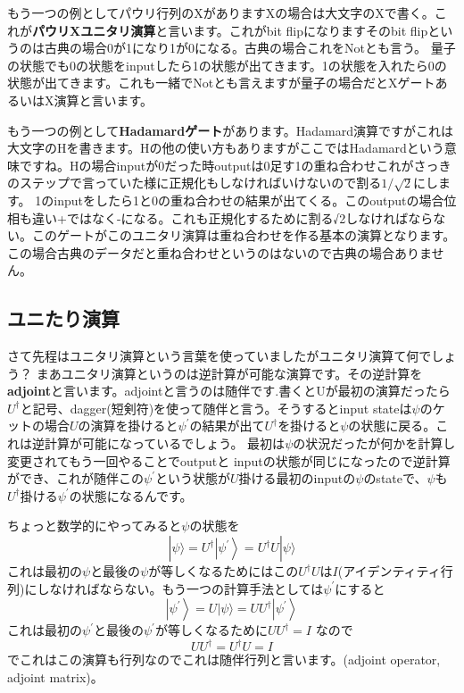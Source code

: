 もう一つの例としてパウリ行列のXがありますXの場合は大文字のXで書く。これが\textbf{パウリXユニタリ演算}と言います。これがbit flipになりますそのbit flipというのは古典の場合0が1になり1が0になる。古典の場合これをNotとも言う。
量子の状態でも0の状態をinputしたら1の状態が出てきます。1の状態を入れたら0の状態が出てきます。これも一緒でNotとも言えますが量子の場合だとXゲートあるいはX演算と言います。

もう一つの例として\textbf{Hadamardゲート}があります。Hadamard演算ですがこれは大文字のHを書きます。Hの他の使い方もありますがここではHadamardという意味ですね。Hの場合inputが0だった時outputは0足す1の重ね合わせこれがさっきのステップで言っていた様に正規化もしなければいけないので割る$1/\sqrt{2}$にします。
1のinputをしたら1と0の重ね合わせの結果が出てくる。このoutputの場合位相も違い+ではなく-になる。これも正規化するために割る√2しなければならない。このゲートがこのユニタリ演算は重ね合わせを作る基本の演算となります。この場合古典のデータだと重ね合わせというのはないので古典の場合ありません。
\subsection{ユニたり演算}
さて先程はユニタリ演算という言葉を使っていましたがユニタリ演算て何でしょう？
まあユニタリ演算というのは逆計算が可能な演算です。その逆計算を\textbf{adjoint}と言います。adjointと言うのは随伴です.書くとUが最初の演算だったら$U^{\dagger}$と記号、dagger(短剣符)を使って随伴と言う。そうするとinput stateは$\psi$のケットの場合$U$の演算を掛けると$\psi^\prime$の結果が出て$U^{\dagger}$を掛けると$\psi$の状態に戻る。これは逆計算が可能になっているでしょう。
最初は$\psi$の状況だったが何かを計算し変更されてもう一回やることでoutputと
inputの状態が同じになったので逆計算ができ、これが随伴この$\psi^\prime$という状態が$U$掛ける最初のinputの$\psi$のstateで、$\psi$も$U^{\dagger}$掛ける$\psi^\prime$の状態になるんです。

ちょっと数学的にやってみると$\psi$の状態を
\begin{equation}
|\psi\rangle=U^{\dagger}\left|\psi^{\prime}\right\rangle=U^{\dagger} U|\psi\rangle
\end{equation} 
これは最初の$\psi$と最後の$\psi$が等しくなるためにはこの$U^{\dagger} U$は$I$(アイデンティティ行列)にしなければならない。もう一つの計算手法としては$\psi^{\prime}$にすると
\begin{equation}
\left|\psi^{\prime}\right\rangle=U|\psi\rangle=U U^{\dagger}\left|\psi^{\prime}\right\rangle
\end{equation}
これは最初の$\psi^{\prime}$と最後の$\psi^{\prime}$が等しくなるために$UU^{\dagger} = I$ なので
\begin{equation}
U U^{\dagger}=U^{\dagger} U=I
\end{equation}
でこれはこの演算も行列なのでこれは随伴行列と言います。(adjoint operator, adjoint matrix)。
